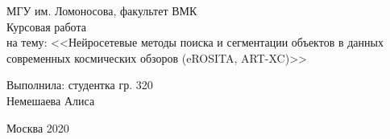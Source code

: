 \begin{center} 

\large МГУ им. Ломоносова, факультет ВМК\\[5.5cm] 

\huge Курсовая работа \\[0.6cm] %
\large на тему:  <<Нейросетевые методы поиска и сегментации объектов в данных современных 
космических обзоров (eROSITA, ART-XC)>>\\[3.7cm]


\end{center} 

\begin{flushright}
Выполнила: студентка гр. 320 \\
Немешаева Алиса \\
\end{flushright}


\vfill 

\begin{center} 
\large Москва 2020
\end{center} 

\thispagestyle{empty}
